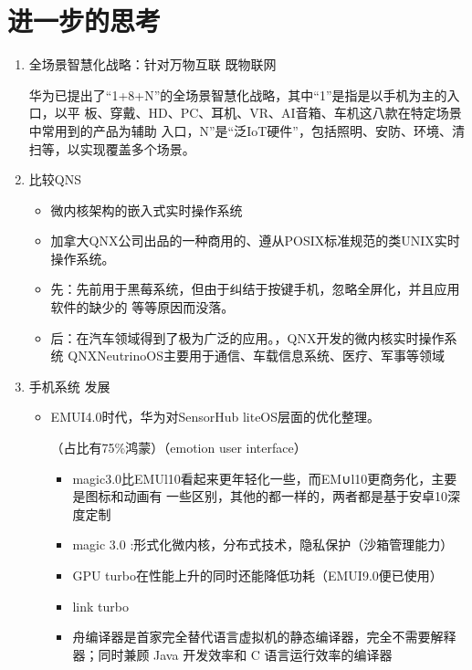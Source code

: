 \documentclass{article}
\begin{document}
\section{进一步的思考}
\begin{enumerate}
	\item 全场景智慧化战略：针对万物互联 既物联网 

    华为已提出了“1+8+N”的全场景智慧化战略，其中“1”是指是以手机为主的入口，以平 板、穿戴、HD、PC、耳机、VR、AI音箱、车机这八款在特定场景中常用到的产品为辅助 入口，N”是“泛IoT硬件”，包括照明、安防、环境、清扫等，以实现覆盖多个场景。 

	\item 比较QNS 
\begin{itemize}
    \item 微内核架构的嵌入式实时操作系统 
    \item 加拿大QNX公司出品的一种商用的、遵从POSIX标准规范的类UNIX实时操作系统。
    \item 先：先前用于黑莓系统，但由于纠结于按键手机，忽略全屏化，并且应用软件的缺少的 等等原因而没落。
    \item 后：在汽车领域得到了极为广泛的应用。，QNX开发的微内核实时操作系统 QNXNeutrinoOS主要用于通信、车载信息系统、医疗、军事等领域 
\end{itemize}
	\item 手机系统 发展

\begin{itemize}

	\item EMUI4.0时代，华为对SensorHub liteOS层面的优化整理。 

	（占比有75\%鸿蒙）（emotion user interface） 
\begin{itemize}
    \item magic3.0比EMUl10看起来更年轻化一些，而EM∪l10更商务化，主要是图标和动画有 一些区别，其他的都一样的，两者都是基于安卓10深度定制
    \item magic 3.0 :形式化微内核，分布式技术，隐私保护（沙箱管理能力） 
    \item GPU turbo在性能上升的同时还能降低功耗（EMUI9.0便已使用） 
    \item link turbo 
\end{itemize}

\begin{itemize}
    \item 舟编译器是首家完全替代语言虚拟机的静态编译器，完全不需要解释器；同时兼顾 Java 开发效率和 C 语言运行效率的编译器


\end{itemize}
\end{itemize}
\end{enumerate}
\end{document}

